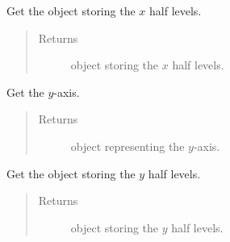 \documentclass[letterpaper,10pt,english]{sphinxmanual}
\begin{document}
\begin{fulllineitems}
\begin{fulllineitems}
\begin{quote}
\begin{description}
\end{description}\end{quote}

\end{fulllineitems}


\begin{fulllineitems}
\label{\detokenize{api:grids.xyz_grid.XYZGrid.x_half_levels}}
Get the  object storing the \(x\) half levels.
\begin{quote}\begin{description}
\item[{Returns}] \leavevmode
{\hyperref[\detokenize{api:grids.axis.Axis}]{}} object storing the \(x\) half levels.

\end{description}\end{quote}

\end{fulllineitems}


\begin{fulllineitems}
\label{\detokenize{api:grids.xyz_grid.XYZGrid.y}}
Get the \(y\)-axis.
\begin{quote}\begin{description}
\item[{Returns}] \leavevmode
{\hyperref[\detokenize{api:grids.axis.Axis}]{}} object representing the \(y\)-axis.

\end{description}\end{quote}

\end{fulllineitems}


\begin{fulllineitems}
\label{\detokenize{api:grids.xyz_grid.XYZGrid.y_half_levels}}
Get the  object storing the \(y\) half levels.
\begin{quote}\begin{description}
\item[{Returns}] \leavevmode
{\hyperref[\detokenize{api:grids.axis.Axis}]{}} object storing the \(y\) half levels.

\end{description}\end{quote}

\end{fulllineitems}


\end{fulllineitems}
\end{document}
